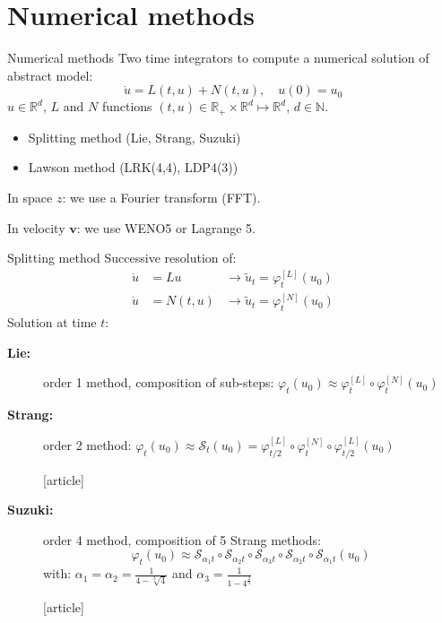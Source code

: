 \documentclass{beamer}
\newcommand{\mbold}[1]{{\textbf{\color{PLB}#1}}}
\newcommand{\customcite}[1]{\cite{#1}}
\newcommand{\Mvb}[1]{\boldsymbol{#1}}
\begin{document}
\section{Numerical methods}
\begin{frame}{Numerical methods}
  Two time integrators to compute a numerical solution of abstract model:
  $$
    \dot{u} = L(t,u) + N(t,u),\quad u(0) = u_0
  $$
  $u\in\mathbb{R}^d$, $L$ and $N$ functions $(t,u)\in\mathbb{R}_+\times\mathbb{R}^d\mapsto\mathbb{R}^d$, $d\in\mathbb{N}$.
  \vfill
  \begin{itemize}
    \item Splitting method (Lie, Strang, Suzuki)
    \item Lawson method (LRK(4,4), LDP4(3))
  \end{itemize}
  \vfill
  
  In space $z$: we use a Fourier transform (FFT).

  In velocity $\Mvb{v}$: we use WENO5 or Lagrange 5.
\end{frame}
\begin{frame}{Splitting method}
  Successive resolution of:
  $$
    \begin{aligned}
      \dot{u} &= Lu     \qquad & \rightarrow \tilde{u}_t = \varphi^{[L]}_t(u_0) \\
      \dot{u} &= N(t,u)        & \rightarrow \tilde{u}_t = \varphi^{[N]}_t(u_0)
    \end{aligned}
  $$
  Solution at time $t$:
  \begin{description}
    \item[\mbold{Lie:}] order 1 method, composition of sub-steps:
        $\varphi_t(u_0) \approx \varphi_t^{[L]} \circ \varphi_t^{[N]}(u_0)$
    \item[\mbold{Strang:}] order 2 method:
        $\varphi_t(u_0) \approx \mathcal{S}_t(u_0) = \varphi_{t/2}^{[L]} \circ \varphi_t^{[N]} \circ \varphi_{t/2}^{[L]} (u_0)$
        \vspace{-0.25cm}
        \begin{thebibliography}{9}
          [article]
           \customcite{Strang:1968}
        \end{thebibliography}
    \item[\mbold{Suzuki:}] order 4 method, composition of 5 Strang methods:
        $$\varphi_t(u_0) \approx \mathcal{S}_{\alpha_1t}\circ\mathcal{S}_{\alpha_2t}\circ\mathcal{S}_{\alpha_3t}\circ\mathcal{S}_{\alpha_2t}\circ\mathcal{S}_{\alpha_1t}(u_0)$$
        with:
        $\alpha_1 = \alpha_2 = \frac{1}{4-\sqrt[3]{4}}$ and $\alpha_3 = \frac{1}{1-4^{\frac{2}{3}}}$
        \vspace{-0.25cm}
        \begin{thebibliography}{9}
          [article]
           \customcite{Suzuki:1990}
        \end{thebibliography}
  \end{description}
\end{frame}
\end{document}
